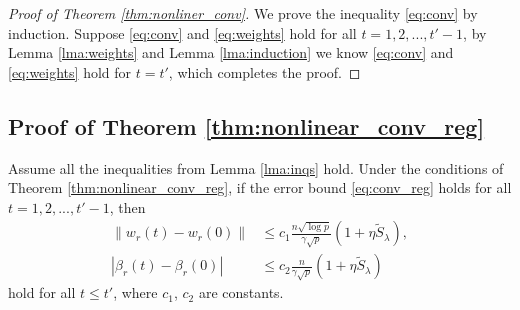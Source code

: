 \begin{proof}[Proof of Theorem \ref{thm:nonliner_conv}]
We prove the inequality \eqref{eq:conv} by induction. Suppose \eqref{eq:conv} and \eqref{eq:weights} hold for all $t=1,2,...,t'-1$, by Lemma \ref{lma:weights} and Lemma \ref{lma:induction} we know \eqref{eq:conv} and \eqref{eq:weights} hold for $t=t'$, which completes the proof.
\end{proof}

\subsection{Proof of Theorem \ref{thm:nonlinear_conv_reg}}

\begin{lemma}
\label{lma:weights_reg}
Assume all the inequalities from Lemma \ref{lma:inqs} hold. Under the conditions of Theorem \ref{thm:nonlinear_conv_reg}, if the error bound \eqref{eq:conv_reg} holds for all $t=1,2,...,t'-1$, then
\begin{equation}
\label{eq:weights_reg}
\begin{aligned}
    \|w_r(t)-w_r(0)\| &\leq c_1\frac{n\sqrt{\log p}}{\gamma\sqrt p}(1+\eta \tilde{S}_\lambda),\\
    |\beta_r(t)-\beta_r(0)| &\leq c_2\frac{n}{\gamma\sqrt p}(1+\eta \tilde{S}_\lambda)
\end{aligned}
\end{equation}
hold for all $t\leq t'$, where $c_1$, $c_2$ are constants.
\end{lemma}

